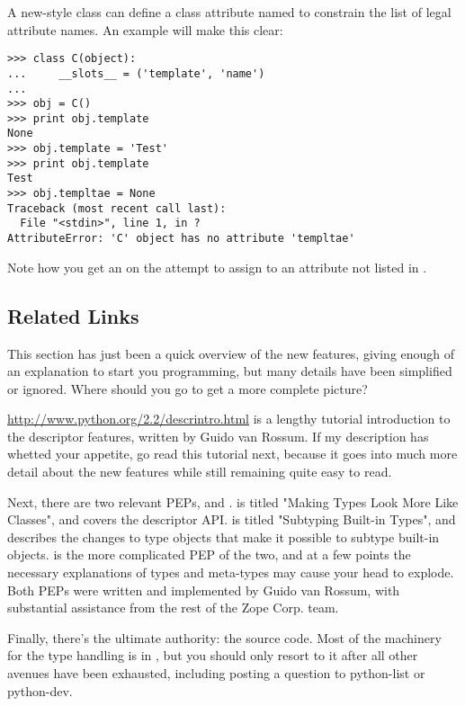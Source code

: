 \documentclass{howto}
\begin{document}
A new-style class can define a class attribute named 
to constrain the list of legal attribute names.  An example will make
this clear:

\begin{verbatim}
>>> class C(object):
...     __slots__ = ('template', 'name')
...
>>> obj = C()
>>> print obj.template
None
>>> obj.template = 'Test'
>>> print obj.template
Test
>>> obj.templtae = None
Traceback (most recent call last):
  File "<stdin>", line 1, in ?
AttributeError: 'C' object has no attribute 'templtae'
\end{verbatim}

Note how you get an  on the attempt to
assign to an attribute not listed in .


\subsection{Related Links}
\label{sect-rellinks}

This section has just been a quick overview of the new features,
giving enough of an explanation to start you programming, but many
details have been simplified or ignored.  Where should you go to get a
more complete picture?

\url{http://www.python.org/2.2/descrintro.html} is a lengthy tutorial
introduction to the descriptor features, written by Guido van Rossum.
If my description has whetted your appetite, go read this tutorial
next, because it goes into much more detail about the new features
while still remaining quite easy to read.

Next, there are two relevant PEPs,  and .  
is titled "Making Types Look More Like Classes", and covers the
descriptor API.   is titled "Subtyping Built-in Types", and
describes the changes to type objects that make it possible to subtype
built-in objects.   is the more complicated PEP of the two,
and at a few points the necessary explanations of types and meta-types
may cause your head to explode.  Both PEPs were written and
implemented by Guido van Rossum, with substantial assistance from the
rest of the Zope Corp. team.

Finally, there's the ultimate authority: the source code.  Most of the
machinery for the type handling is in , but
you should only resort to it after all other avenues have been
exhausted, including posting a question to python-list or python-dev. 
\end{document}
